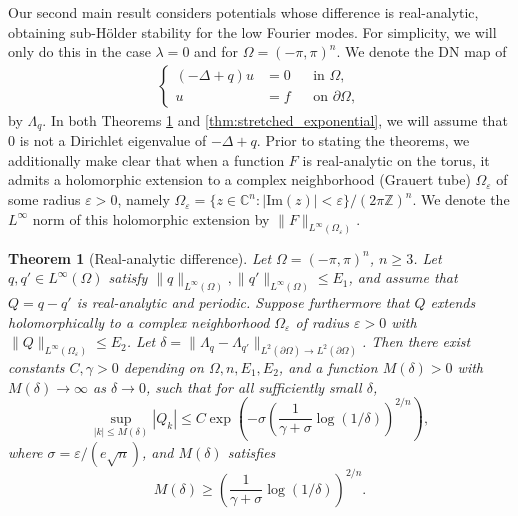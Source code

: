 \documentclass[a4paper, 11pt, twoside, notitlepage]{amsart}
\newtheorem{theorem}{Theorem}[section]
\theoremstyle{definition}
\theoremstyle{remark}
\begin{document}
Our second main result considers potentials whose difference is real-analytic, obtaining sub-Hölder stability for the low Fourier modes. For simplicity, we will only do this in the case $\lambda=0$ and for $\Omega = (-\pi,\pi)^n$. We denote the DN map of
\begin{align*}
    \left\{
    \begin{aligned}
        (-\Delta+q)u &= 0  &&\text{in } \Omega, \\ 
        u &= f  &&\text{on } \partial\Omega,
    \end{aligned}
    \right.
\end{align*}
by $\Lambda_q$. In both Theorems \ref{thm:analytic_case} and \ref{thm:stretched_exponential}, we will assume that $0$ is not a Dirichlet eigenvalue of $-\Delta+q$. Prior to stating the theorems, we additionally make clear that when a function $F$ is real-analytic on the torus, it admits a holomorphic extension to a complex neighborhood (Grauert tube) $\Omega_{\varepsilon}$ of some radius $\varepsilon > 0$, namely $\Omega_{\varepsilon} = \{ z \in \mathbb{C}^n : |\mathrm{Im}(z)| < \varepsilon \}/(2\pi\mathbb{Z})^n$. We denote the $L^\infty$ norm of this holomorphic extension by $\|F\|_{L^\infty(\Omega_{\varepsilon})}$.

\begin{theorem}[Real-analytic difference]\label{thm:analytic_case}
Let $\Omega = (-\pi,\pi)^n$, $n \geq 3$. Let $q, q' \in L^{\infty}(\Omega)$ satisfy $\|q\|_{L^{\infty}(\Omega)}, \|q'\|_{L^{\infty}(\Omega)} \leq E_1$, and assume that $Q = q - q'$ is real-analytic and periodic. Suppose furthermore that $Q$ extends holomorphically to a complex neighborhood $\Omega_\varepsilon$ of radius $\varepsilon > 0$ with $\|Q\|_{L^{\infty}(\Omega_\varepsilon)} \leq E_2$. Let $\delta = \|\Lambda_q - \Lambda_{q'}\|_{L^2(\partial\Omega) \to L^2(\partial\Omega)}$. Then there exist constants $C, \gamma > 0$ depending on $\Omega, n, E_1, E_2$, and a function $M(\delta) > 0$ with $M(\delta) \to \infty$ as $\delta \to 0$, such that for all sufficiently small $\delta$,
\[
\sup_{|k| \leq M(\delta)} |Q_k| \leq C \exp\left(-\sigma \left(\frac{1}{\gamma+\sigma}\log(1/\delta)\right)^{2/n}\right),
\]
where $\sigma = \varepsilon/(e \sqrt{n})$, and $M(\delta)$ satisfies
\[
M(\delta) \geq \left(\frac{1}{\gamma+\sigma}\log(1/\delta)\right)^{2/n}.
\]
\end{theorem}
\end{document}
